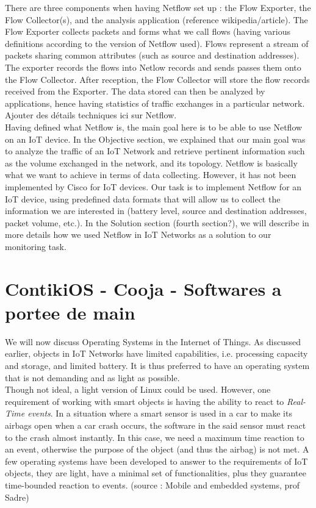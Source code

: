 There are three components when having Netflow set up : the Flow Exporter, the Flow Collector(s), and the analysis application (reference wikipedia/article). The Flow Exporter collects packets and forms what we call flows (having various definitions according to the version of Netflow used). Flows represent a stream of packets sharing common attributes (such as source and destination addresses). The exporter records the flows into Netlow records and sends passes them onto the Flow Collector. After reception, the Flow Collector will store the flow records received from the Exporter. The data stored can then be analyzed by applications, hence having statistics of traffic exchanges in a particular network.\\

Ajouter des détails techniques ici sur Netflow.\\

Having defined what Netflow is, the main goal here is to be able to use Netflow on an IoT device. In the Objective section, we explained that our main goal was to analyze the traffic of an IoT Network and retrieve pertinent information such as the volume exchanged in the network, and its topology. Netflow is basically what we want to achieve in terms of data collecting. However, it has not been implemented by Cisco for IoT devices. Our task is to implement Netflow for an IoT device, using predefined data formats that will allow us to collect the information we are interested in (battery level, source and destination addresses, packet volume, etc.). In the Solution section (fourth section?), we will describe in more details how we used Netflow in IoT Networks as a solution to our monitoring task.

\section{ContikiOS - Cooja - Softwares a portee de main}
We will now discuss Operating Systems in the Internet of Things. As discussed earlier, objects in IoT Networks have limited capabilities, i.e. processing capacity and storage, and limited battery. It is thus preferred to have an operating system that is not demanding and as light as possible. \\

Though not ideal, a light version of Linux could be used. However, one requirement of working with smart objects is having the ability to react to \textit{Real-Time events}. In a situation where a smart sensor is used in a car to make its airbags open when a car crash occurs, the software in the said sensor must react to the crash almost instantly. In this case, we need a maximum time reaction to an event, otherwise the purpose of the object (and thus the airbag) is not met. A few operating systems have been developed to answer to the requirements of IoT objects, they are light, have a minimal set of functionalities, plus they guarantee time-bounded reaction to events. (source : Mobile and embedded systems, prof Sadre)\\

